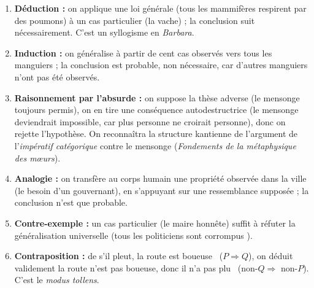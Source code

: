 \documentclass[11pt]{article}
\begin{document}
\begin{corrige}
\begin{enumerate}
\item \textbf{Déduction :} on applique une loi générale (tous les mammifères respirent par des poumons) à un cas particulier (la vache) ; la conclusion suit nécessairement. C'est un syllogisme en \emph{Barbara}.
\item \textbf{Induction :} on généralise à partir de cent cas observés vers tous les manguiers ; la conclusion est probable, non nécessaire, car d'autres manguiers n'ont pas été observés.
\item \textbf{Raisonnement par l'absurde :} on suppose la thèse adverse (le mensonge toujours permis), on en tire une conséquence autodestructrice (le mensonge deviendrait impossible, car plus personne ne croirait personne), donc on rejette l'hypothèse. On reconnaîtra la structure kantienne de l'argument de l'\emph{impératif catégorique} contre le mensonge (\emph{Fondements de la métaphysique des mœurs}).
\item \textbf{Analogie :} on transfère au corps humain une propriété observée dans la ville (le besoin d'un gouvernant), en s'appuyant sur une ressemblance supposée ; la conclusion n'est que probable.
\item \textbf{Contre-exemple :} un cas particulier (le maire honnête) suffit à réfuter la généralisation universelle (\guillemotleft tous les politiciens sont corrompus \guillemotright).
\item \textbf{Contraposition :} de \guillemotleft s'il pleut, la route est boueuse \guillemotright\ ($P \Rightarrow Q$), on déduit validement \guillemotleft la route n'est pas boueuse, donc il n'a pas plu \guillemotright\ (non-$Q \Rightarrow$ non-$P$). C'est le \emph{modus tollens}.
\end{enumerate}
\end{corrige}
\end{document}
